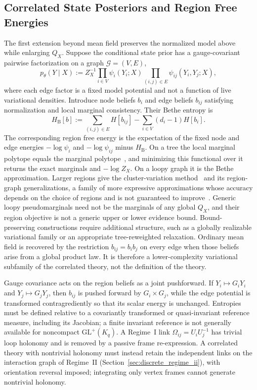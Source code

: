 \subsection{Correlated State Posteriors and Region Free Energies}

The first extension beyond mean field preserves the normalized model above while enlarging $Q_X$. Suppose the conditional state prior has a gauge-covariant pairwise factorization on a graph $\mathcal{G}=(V,E)$,
\begin{equation}
p_\theta(Y\mid X)
:=Z_X^{-1}
\prod_{i\in V}\psi_i(Y_i;X)
\prod_{(i,j)\in E}\psi_{ij}(Y_i,Y_j;X),
\label{eq:beyond_mf_pairwise_joint}
\end{equation}
where each edge factor is a fixed model potential and not a function of live variational densities. Introduce node beliefs $b_i$ and edge beliefs $b_{ij}$ satisfying normalization and local marginal consistency. Their Bethe entropy is
\begin{equation}
H_{\mathrm{B}}[b]
:=\sum_{(i,j)\in E}H[b_{ij}]
-\sum_{i\in V}(d_i-1)H[b_i].
\label{eq:beyond_mf_bethe_entropy}
\end{equation}
The corresponding region free energy is the expectation of the fixed node and edge energies $-\log\psi_i$ and $-\log\psi_{ij}$ minus $H_{\mathrm{B}}$. On a tree the local marginal polytope equals the marginal polytope~\cite[Prop.~4.1]{Wainwright2008}, and minimizing this functional over it returns the exact marginals and $-\log Z_X$. On a loopy graph it is the Bethe approximation. Larger regions give the cluster-variation method~\cite{Kikuchi1951} and its region-graph generalizations, a family of more expressive approximations whose accuracy depends on the choice of regions and is not guaranteed to improve~\cite[Sec.~VIII.C]{Yedidia2005}. Generic loopy pseudomarginals need not be the marginals of any global $Q_X$, and their region objective is not a generic upper or lower evidence bound. Bound-preserving constructions require additional structure, such as a globally realizable variational family or an appropriate tree-reweighted relaxation. Ordinary mean field is recovered by the restriction $b_{ij}=b_i b_j$ on every edge when those beliefs arise from a global product law. It is therefore a lower-complexity variational subfamily of the correlated theory, not the definition of the theory.

Gauge covariance acts on the region beliefs as a joint pushforward. If $Y_i\mapsto G_iY_i$ and $Y_j\mapsto G_jY_j$, then $b_{ij}$ is pushed forward by $G_i\times G_j$, while the edge potential is transformed contragrediently so that its scalar energy is unchanged. Entropies must be defined relative to a covariantly transformed or quasi-invariant reference measure, including its Jacobian; a finite invariant reference is not generally available for noncompact $\mathrm{GL}^+(K_q)$. A Regime~I link $\Omega_{ij}=U_iU_j^{-1}$ has trivial loop holonomy and is removed by a passive frame re-expression. A correlated theory with nontrivial holonomy must instead retain the independent links on the interaction graph of Regime~II (Section~\ref{sec:discrete_regime_ii}), with orientation reversal imposed; integrating only vertex frames cannot generate nontrivial holonomy.

